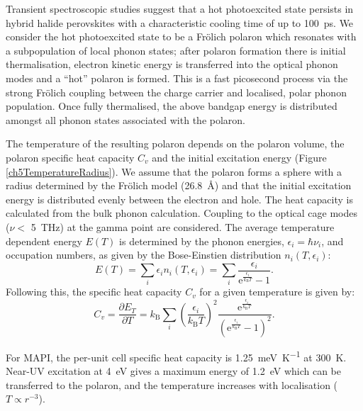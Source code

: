 Transient spectroscopic studies\autocite{Klein2016,Price2015,Yang2016e} suggest that a hot photoexcited state persists in hybrid halide perovskites with a characteristic cooling time of up to \SI{100}{\pico\second}.
We consider the hot photoexcited state to be a Fr\"{o}lich polaron which resonates with a subpopulation of local phonon states; after polaron formation there is initial thermalisation, electron kinetic energy is transferred into the optical phonon modes and a ``hot'' polaron is formed.
This is a fast picosecond process via the strong Fr\"{o}lich coupling between the charge carrier and localised, polar phonon population. Once fully thermalised, the above bandgap energy is distributed amongst all phonon states associated with the polaron.

The temperature of the resulting polaron depends on the polaron volume, the polaron specific heat capacity $C_v$ and the initial excitation energy (Figure \ref{ch5TemperatureRadius}). We assume that the polaron forms a sphere with a radius determined by the Fr\"{o}lich model (\SI{26.8}{\angstrom}) and that the initial excitation energy is distributed evenly between the electron and hole. 
The heat capacity is calculated from the bulk phonon calculation. Coupling to the optical cage modes ($\nu <$ \SI{5}{\tera\hertz}\autocite{Leguy2016}) at the gamma point are considered. The average temperature dependent energy $E(T)$ is determined by the phonon energies, $\epsilon_i = \hbar\nu_i$, and occupation numbers, as given by the Bose-Einstien distribution $n_i(T,\epsilon_i)$:
\begin{equation}
    E(T) = \sum_i \epsilon_i n_i(T,\epsilon_i) = \sum_i \frac{\epsilon_i}{\textrm{e}^{\frac{\epsilon_i}{k_\mathrm{B}T}}-1}.
\end{equation}
Following this, the specific heat capacity $C_v$ for a given temperature is given by:
\begin{equation}
    C_v = \frac{\partial E_T}{\partial T} = k_\mathrm{B} \sum_i \left(\frac{\epsilon_i}{k_\mathrm{B}T}\right)^2 \frac{\textrm{e}^{\frac{\epsilon_i}{k_\mathrm{B}T}}}{\left(\textrm{e}^{\frac{\epsilon_i}{k_\mathrm{B}T}}-1\right)^2}.
\end{equation}

For MAPI, the per-unit cell specific heat capacity is \SI{1.25}{\milli\eV\per\K} at
\SI{300}{\K}. Near-UV excitation at \SI{4}{\eV} gives a maximum energy of \SI{1.2}{\eV} which can be transferred to the polaron, and the temperature increases with localisation ($T \propto r^{-3}$).

